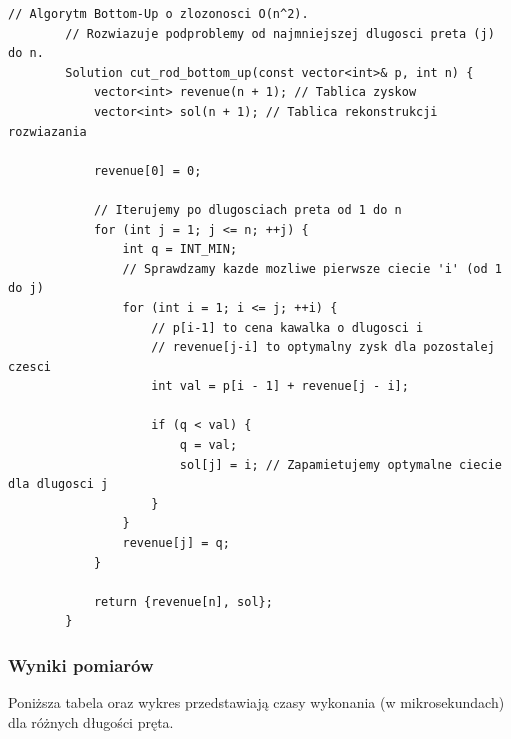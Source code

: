 \documentclass{article}
\begin{document}
	\begin{lstlisting}[caption={Fragment implementacji: Rod Cutting (wersja iteracyjna)}]
		// Algorytm Bottom-Up o zlozonosci O(n^2).
		// Rozwiazuje podproblemy od najmniejszej dlugosci preta (j) do n.
		Solution cut_rod_bottom_up(const vector<int>& p, int n) {
			vector<int> revenue(n + 1); // Tablica zyskow 
			vector<int> sol(n + 1); // Tablica rekonstrukcji rozwiazania
			
			revenue[0] = 0;
			
			// Iterujemy po dlugosciach preta od 1 do n
			for (int j = 1; j <= n; ++j) {
				int q = INT_MIN;
				// Sprawdzamy kazde mozliwe pierwsze ciecie 'i' (od 1 do j)
				for (int i = 1; i <= j; ++i) {
					// p[i-1] to cena kawalka o dlugosci i
					// revenue[j-i] to optymalny zysk dla pozostalej czesci
					int val = p[i - 1] + revenue[j - i];
					
					if (q < val) {
						q = val;
						sol[j] = i; // Zapamietujemy optymalne ciecie dla dlugosci j
					}
				}
				revenue[j] = q;
			}
			
			return {revenue[n], sol};
		}
	\end{lstlisting}
	
	\subsubsection{Wyniki pomiarów}
	Poniższa tabela oraz wykres przedstawiają czasy wykonania (w mikrosekundach) dla różnych długości pręta.
	
	\begin{table}[H]
		\centering
		\caption{Wyniki pomiarów dla algorytmów Rod Cutting}
	\end{table}
	
\end{document}
